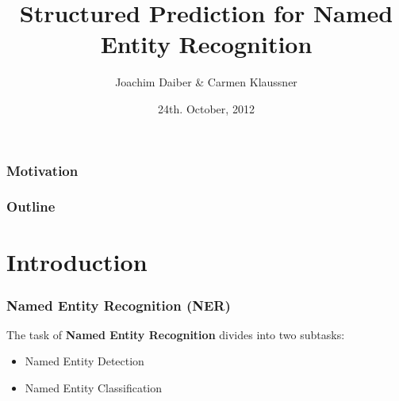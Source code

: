 \documentclass[10pt]{beamer}
\title[Machine Learning] %
{
Structured Prediction for Named Entity Recognition}
\author %
{Joachim Daiber \& Carmen Klaussner}
\institute[University of Groningen] %
 {
  Information Science\\
  University of Groningen
  }
\date[Short Occasion] %
{24th. October, 2012}
\begin{document}
\begin{frame}
  \titlepage
\end{frame}



\begin{frame}
\frametitle{Motivation}


\end{frame}







\begin{frame}
  \frametitle{Outline}
  \tableofcontents
\end{frame}





\section{Introduction}
\begin{frame}
\frametitle{Named Entity Recognition (NER)}

The task of \textbf{Named Entity Recognition} divides into 
two subtasks: \\
\begin{itemize}
 \item Named Entity Detection 
 \item Named Entity Classification
\end{itemize}
\end{frame}


\end{document}
